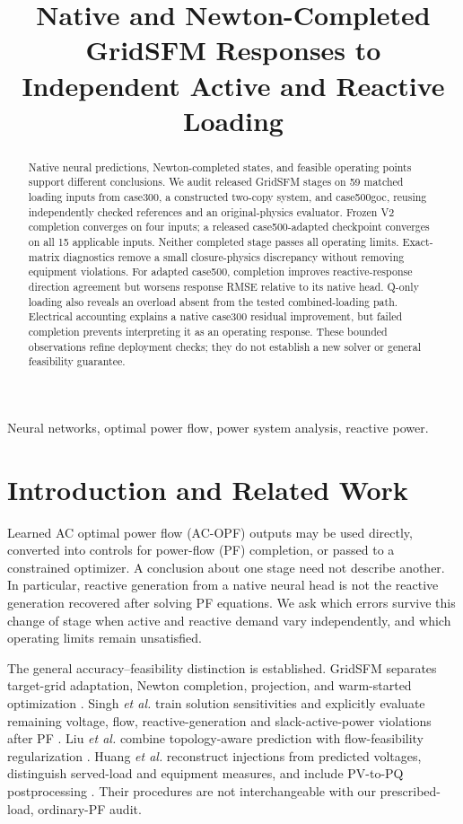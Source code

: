 \documentclass[conference,letterpaper]{IEEEtran}
\title{Native and Newton-Completed GridSFM Responses to Independent Active and Reactive Loading}
\author{\IEEEauthorblockN{Review draft: author list and affiliations pending confirmation}}
\begin{document}
\maketitle
\begin{abstract}
Native neural predictions, Newton-completed states, and feasible operating points support different conclusions. We audit released GridSFM stages on 59 matched loading inputs from case300, a constructed two-copy system, and case500goc, reusing independently checked references and an original-physics evaluator. Frozen V2 completion converges on four inputs; a released case500-adapted checkpoint converges on all 15 applicable inputs. Neither completed stage passes all operating limits. Exact-matrix diagnostics remove a small closure-physics discrepancy without removing equipment violations. For adapted case500, completion improves reactive-response direction agreement but worsens response RMSE relative to its native head. Q-only loading also reveals an overload absent from the tested combined-loading path. Electrical accounting explains a native case300 residual improvement, but failed completion prevents interpreting it as an operating response. These bounded observations refine deployment checks; they do not establish a new solver or general feasibility guarantee.
\end{abstract}
\begin{IEEEkeywords}Neural networks, optimal power flow, power system analysis, reactive power.\end{IEEEkeywords}

\section{Introduction and Related Work}
Learned AC optimal power flow (AC-OPF) outputs may be used directly, converted into controls for power-flow (PF) completion, or passed to a constrained optimizer. A conclusion about one stage need not describe another. In particular, reactive generation from a native neural head is not the reactive generation recovered after solving PF equations. We ask which errors survive this change of stage when active and reactive demand vary independently, and which operating limits remain unsatisfied.

The general accuracy--feasibility distinction is established. GridSFM separates target-grid adaptation, Newton completion, projection, and warm-started optimization \cite{gridsfm}. Singh \emph{et al.} train solution sensitivities and explicitly evaluate remaining voltage, flow, reactive-generation and slack-active-power violations after PF \cite{singh}. Liu \emph{et al.} combine topology-aware prediction with flow-feasibility regularization \cite{liu}. Huang \emph{et al.} reconstruct injections from predicted voltages, distinguish served-load and equipment measures, and include PV-to-PQ postprocessing \cite{huang}. Their procedures are not interchangeable with our prescribed-load, ordinary-PF audit.
\end{document}
